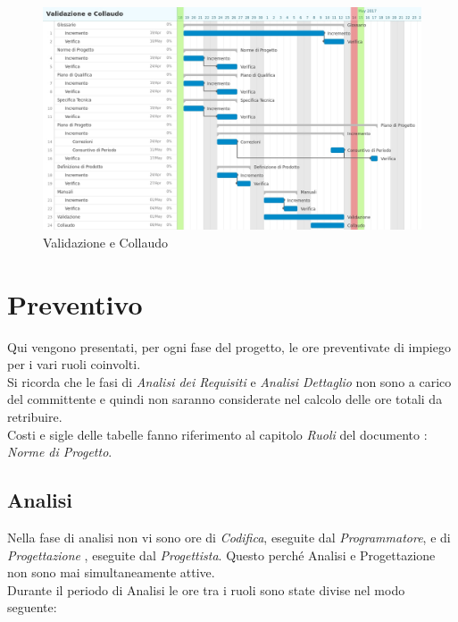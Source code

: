 \documentclass[12pt,a4paper,titlepage]{article}
\begin{document}
	\begin{figure}
		\centering
		\includegraphics[width=1\linewidth]{"Gantt Validazione e Collaudo"}
		\caption{Validazione e Collaudo}
		\label{fig:gantt-validazione-e-collaudo}
	\end{figure}
	
	
	\newpage
	
	\section{Preventivo}
	Qui vengono presentati, per ogni fase del progetto, le ore preventivate di impiego per i vari
	ruoli coinvolti.\\
	Si ricorda che le fasi di \textit{Analisi dei Requisiti} e \textit{Analisi Dettaglio} non sono a carico del committente e quindi non saranno considerate nel calcolo delle ore totali da retribuire. \\
	Costi e sigle delle tabelle fanno riferimento al capitolo \textit{Ruoli} del documento : \textit{Norme di Progetto}.
	
	\subsection{Analisi}
	Nella fase di analisi non vi sono ore di \textit{Codifica}, eseguite dal \textit{Programmatore}, e di \textit{Progettazione} , eseguite dal \textit{Progettista}. Questo perché Analisi e Progettazione non sono mai simultaneamente attive. \\
	Durante il periodo di Analisi le ore tra i ruoli sono state divise nel modo seguente: \\
	
\end{document}
